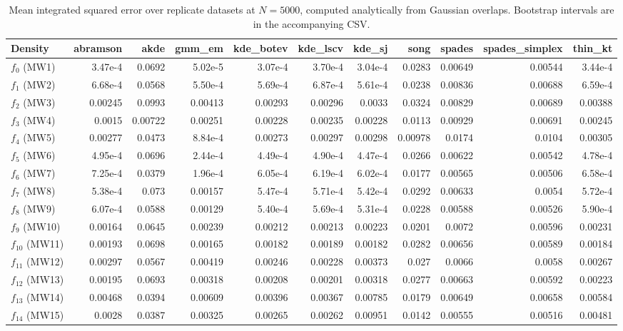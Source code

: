 \begin{table}[htbp]
\centering
\caption{Mean integrated squared error over replicate datasets at $N=5000$, computed analytically from Gaussian overlaps. Bootstrap intervals are in the accompanying CSV.}
\label{tab:ise-N5000}
\begin{tabular}{lrrrrrrrrrr}
\toprule
Density & abramson & akde & gmm\_em & kde\_botev & kde\_lscv & kde\_sj & song & spades & spades\_simplex & thin\_kt \\
\midrule
$f_{0}$ (MW1) & 3.47e-4 & 0.0692 & 5.02e-5 & 3.07e-4 & 3.70e-4 & 3.04e-4 & 0.0283 & 0.00649 & 0.00544 & 3.44e-4 \\
$f_{1}$ (MW2) & 6.68e-4 & 0.0568 & 5.50e-4 & 5.69e-4 & 6.87e-4 & 5.61e-4 & 0.0238 & 0.00836 & 0.00688 & 6.59e-4 \\
$f_{2}$ (MW3) & 0.00245 & 0.0993 & 0.00413 & 0.00293 & 0.00296 & 0.0033 & 0.0324 & 0.00829 & 0.00689 & 0.00388 \\
$f_{3}$ (MW4) & 0.0015 & 0.00722 & 0.00251 & 0.00228 & 0.00235 & 0.00228 & 0.0113 & 0.00929 & 0.00691 & 0.00245 \\
$f_{4}$ (MW5) & 0.00277 & 0.0473 & 8.84e-4 & 0.00273 & 0.00297 & 0.00298 & 0.00978 & 0.0174 & 0.0104 & 0.00305 \\
$f_{5}$ (MW6) & 4.95e-4 & 0.0696 & 2.44e-4 & 4.49e-4 & 4.90e-4 & 4.47e-4 & 0.0266 & 0.00622 & 0.00542 & 4.78e-4 \\
$f_{6}$ (MW7) & 7.25e-4 & 0.0379 & 1.96e-4 & 6.05e-4 & 6.19e-4 & 6.02e-4 & 0.0177 & 0.00565 & 0.00506 & 6.58e-4 \\
$f_{7}$ (MW8) & 5.38e-4 & 0.073 & 0.00157 & 5.47e-4 & 5.71e-4 & 5.42e-4 & 0.0292 & 0.00633 & 0.0054 & 5.72e-4 \\
$f_{8}$ (MW9) & 6.07e-4 & 0.0588 & 0.00129 & 5.40e-4 & 5.69e-4 & 5.31e-4 & 0.0228 & 0.00588 & 0.00526 & 5.90e-4 \\
$f_{9}$ (MW10) & 0.00164 & 0.0645 & 0.00239 & 0.00212 & 0.00213 & 0.00223 & 0.0201 & 0.0072 & 0.00596 & 0.00231 \\
$f_{10}$ (MW11) & 0.00193 & 0.0698 & 0.00165 & 0.00182 & 0.00189 & 0.00182 & 0.0282 & 0.00656 & 0.00589 & 0.00184 \\
$f_{11}$ (MW12) & 0.00297 & 0.0567 & 0.00419 & 0.00246 & 0.00228 & 0.00373 & 0.027 & 0.0066 & 0.0058 & 0.00267 \\
$f_{12}$ (MW13) & 0.00195 & 0.0693 & 0.00318 & 0.00208 & 0.00201 & 0.00318 & 0.0277 & 0.00663 & 0.00592 & 0.00223 \\
$f_{13}$ (MW14) & 0.00468 & 0.0394 & 0.00609 & 0.00396 & 0.00367 & 0.00785 & 0.0179 & 0.00649 & 0.00658 & 0.00584 \\
$f_{14}$ (MW15) & 0.0028 & 0.0387 & 0.00325 & 0.00265 & 0.00262 & 0.00951 & 0.0142 & 0.00555 & 0.00516 & 0.00481 \\
\bottomrule
\end{tabular}
\end{table}